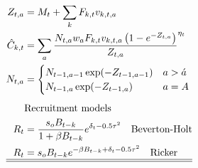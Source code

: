 \begin{table}[!tpb]
\begin{align}
        Z_{t,a}&=M_t+\sum_k F_{k,t} v_{k,t,a}\label{T4.9}\\
        \hat{C}_{k,t}&=\sum _ a\frac {N_{{t,a}}w_{{a}}F_{k,t} v_{{k,t,a}}
        \left( 1-{e^{-Z_{t,a}}} \right) }{Z_{t,a}}^{\eta_t} \label{T4.10}\\
        N_{t,a}&=\begin{cases}
            N_{t-1,a-1} \exp(-Z_{t-1,a-1}) &a>\acute{a}\\
            N_{t-1,a} \exp(-Z_{t-1,a}) & a=A
        \end{cases}\label{T4.11}\\[1ex]
        &\mbox{Recruitment models} \nonumber\\
        R_t &= \frac{s_oB_{t-k}}{1+\beta B_{t-k}}e^{\delta_{t}-0.5\tau^2} 
        	\quad \mbox{Beverton-Holt} \label{T4.12}\\
        R_t &= s_oB_{t-k}e^{-\beta B_{t-k}+\delta_t-0.5\tau^2} 
        	\quad \mbox{Ricker} \label{T4.13}\\
        \hline \hline \nonumber
    \end{align}

    \normalEq
\end{table}

